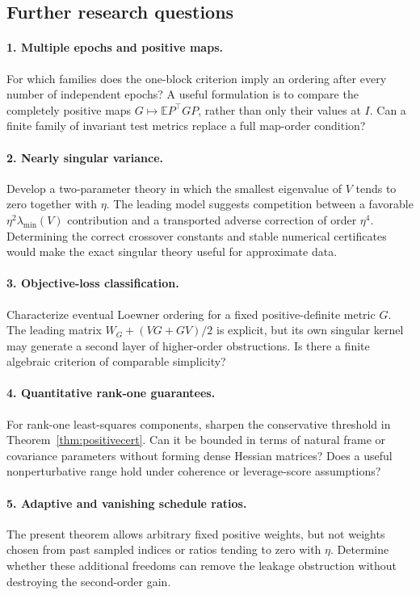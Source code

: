 \documentclass[11pt,letterpaper]{article}
\numberwithin{equation}{section}
\theoremstyle{definition}
\newcommand{\E}{\mathbb E}
\begin{document}
\subsection{Further research questions}

\paragraph{1. Multiple epochs and positive maps.}
For which families does the one-block criterion imply an ordering after every number of independent epochs? A useful formulation is to compare the completely positive maps $G\mapsto\E P^\top GP$, rather than only their values at $I$. Can a finite family of invariant test metrics replace a full map-order condition?

\paragraph{2. Nearly singular variance.}
Develop a two-parameter theory in which the smallest eigenvalue of $V$ tends to zero together with $\eta$. The leading model suggests competition between a favorable $\eta^2\lambda_{\min}(V)$ contribution and a transported adverse correction of order $\eta^4$. Determining the correct crossover constants and stable numerical certificates would make the exact singular theory useful for approximate data.

\paragraph{3. Objective-loss classification.}
Characterize eventual Loewner ordering for a fixed positive-definite metric $G$. The leading matrix $W_G+(VG+GV)/2$ is explicit, but its own singular kernel may generate a second layer of higher-order obstructions. Is there a finite algebraic criterion of comparable simplicity?

\paragraph{4. Quantitative rank-one guarantees.}
For rank-one least-squares components, sharpen the conservative threshold in Theorem~\ref{thm:positivecert}. Can it be bounded in terms of natural frame or covariance parameters without forming dense Hessian matrices? Does a useful nonperturbative range hold under coherence or leverage-score assumptions?

\paragraph{5. Adaptive and vanishing schedule ratios.}
The present theorem allows arbitrary fixed positive weights, but not weights chosen from past sampled indices or ratios tending to zero with $\eta$. Determine whether these additional freedoms can remove the leakage obstruction without destroying the second-order gain.
\end{document}
